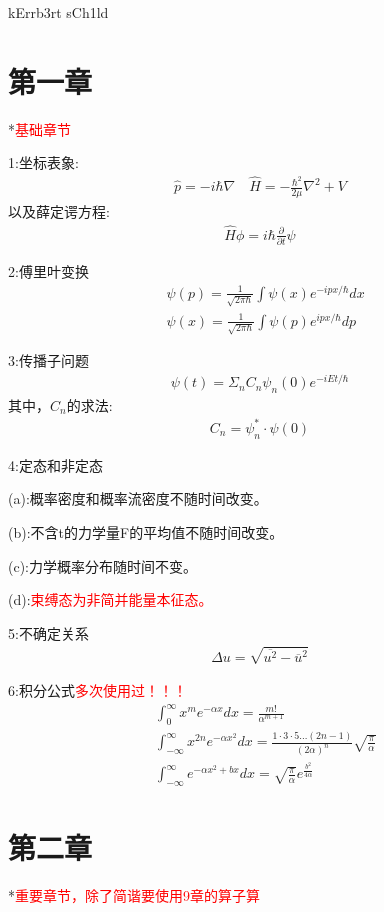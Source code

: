 \documentclass[10pt,journal,compsoc]{IEEEtran}
\begin{document}
kErrb3rt sCh1ld

\section{第一章}
*\textcolor{red}{基础章节}

1:坐标表象:
\begin{align}
  \hat p=-i\hbar \nabla\quad \hat H =-\frac{\hbar^2}{2\mu}\nabla^2+V
\end{align}
以及薛定谔方程:
\begin{align}
  \hat H\phi=i\hbar \frac{ \partial }{ \partial t}\psi
\end{align}

2:傅里叶变换
\begin{align}
  & \psi(p)=\frac1{\sqrt{2\pi\hbar}}\int \psi(x)e^{-ipx/\hbar}dx \\
  &\psi(x)=\frac{1}{\sqrt{2\pi\hbar}}\int \psi(p)e^{ipx/\hbar}dp
\end{align}

3:传播子问题
\begin{align}
  \psi(t)=\Sigma_nC_n\psi_n(0)e^{-iEt/\hbar}
\end{align}
其中，$C_n$的求法:\begin{align}
  C_n=\psi^*_n\cdot\psi(0)
\end{align}

4:定态和非定态

(a):概率密度和概率流密度不随时间改变。

(b):不含t的力学量F的平均值不随时间改变。

(c):力学概率分布随时间不变。

(d):\textcolor{red}{束缚态为非简并能量本征态。}

5:不确定关系
\begin{align}
  \Delta u=\sqrt{\overline{u^2}-{\overline{u}}^2}
\end{align}

6:积分公式\textcolor{red}{多次使用过！！！}
\begin{align}
&\int^{\infty}_{0} x^me^{{-\alpha x}}dx = \frac{m!}{\alpha^{m+1}} \\
& \int^{\infty}_{-\infty}x^{2n}e^{-\alpha x^2}dx=\frac{1\cdot3\cdot5\dots (2n-1)}{(2\alpha)^n}\sqrt{\frac{\pi}{\alpha}}\\
&\int^{\infty}_{-\infty}e^{-\alpha x^2+bx}dx=\sqrt{\frac{\pi}{\alpha}}e^{\frac{b^2}{4\alpha}}
\end{align}

\section{第二章}
*\textcolor{red}{重要章节，除了简谐要使用9章的算子算}
\end{document}
